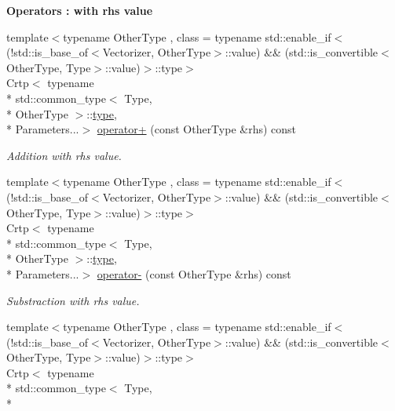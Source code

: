 \begin{Indent}{\bf Operators \-: with rhs value}\par
\begin{DoxyCompactItemize}
\item 
{\footnotesize template$<$typename Other\-Type , class  = typename std\-::enable\-\_\-if$<$(!std\-::is\-\_\-base\-\_\-of$<$\-Vectorizer, Other\-Type$>$\-::value) \&\& (std\-::is\-\_\-convertible$<$\-Other\-Type, Type$>$\-::value)$>$\-::type$>$ }\\Crtp$<$ typename \\*
std\-::common\-\_\-type$<$ Type, \\*
Other\-Type $>$\-::\hyperlink{classmagrathea_1_1StaticVectorizer_a28c393a3896a3e839008c35d56b10a54}{type}, \\*
Parameters...$>$ \hyperlink{classmagrathea_1_1StaticVectorizer_aae18798ce202c372877ffad6dd05a6ee}{operator+} (const Other\-Type \&rhs) const 
\begin{DoxyCompactList}\small\item\em Addition with rhs value. \end{DoxyCompactList}\item 
{\footnotesize template$<$typename Other\-Type , class  = typename std\-::enable\-\_\-if$<$(!std\-::is\-\_\-base\-\_\-of$<$\-Vectorizer, Other\-Type$>$\-::value) \&\& (std\-::is\-\_\-convertible$<$\-Other\-Type, Type$>$\-::value)$>$\-::type$>$ }\\Crtp$<$ typename \\*
std\-::common\-\_\-type$<$ Type, \\*
Other\-Type $>$\-::\hyperlink{classmagrathea_1_1StaticVectorizer_a28c393a3896a3e839008c35d56b10a54}{type}, \\*
Parameters...$>$ \hyperlink{classmagrathea_1_1StaticVectorizer_a294a71924f6f57b8e03edcbfb12c0c54}{operator-\/} (const Other\-Type \&rhs) const 
\begin{DoxyCompactList}\small\item\em Substraction with rhs value. \end{DoxyCompactList}\item 
{\footnotesize template$<$typename Other\-Type , class  = typename std\-::enable\-\_\-if$<$(!std\-::is\-\_\-base\-\_\-of$<$\-Vectorizer, Other\-Type$>$\-::value) \&\& (std\-::is\-\_\-convertible$<$\-Other\-Type, Type$>$\-::value)$>$\-::type$>$ }\\Crtp$<$ typename \\*
std\-::common\-\_\-type$<$ Type, \\*

\end{DoxyCompactItemize}
\end{Indent}
